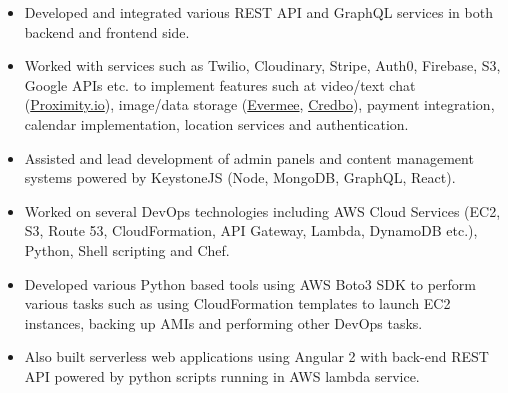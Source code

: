 \documentclass[10pt,a4paper,ragged2e]{maltacv}
\begin{document}
\begin{itemize}
  \item Developed and integrated various REST API and GraphQL services in both backend and frontend side.
  \item Worked with services such as Twilio, Cloudinary, Stripe, Auth0, Firebase, S3, Google APIs etc. to implement features such at video/text chat (\href{https://prox.io/}{Proximity.io}), image/data storage (\href{https://play.google.com/store/apps/details?id=com.evermee}{Evermee}, \href{https://www.credbo.com/}{Credbo}), payment integration, calendar implementation, location services and authentication.  
  \item Assisted and lead development of admin panels and content management systems powered by KeystoneJS (Node, MongoDB, GraphQL, React).
\end{itemize}

\divider

\begin{itemize}
  \item Worked on several DevOps technologies including AWS Cloud Services (EC2, S3, Route 53, CloudFormation, API Gateway, Lambda, DynamoDB etc.), Python, Shell scripting and Chef. 
  \item Developed various Python based tools using AWS Boto3 SDK to perform various tasks such as using CloudFormation templates to launch EC2 instances, backing up AMIs and performing other DevOps tasks. 
  \item Also built serverless web applications using Angular 2 with back-end REST API powered by python scripts running in AWS lambda service.
\end{itemize}
\end{document}
